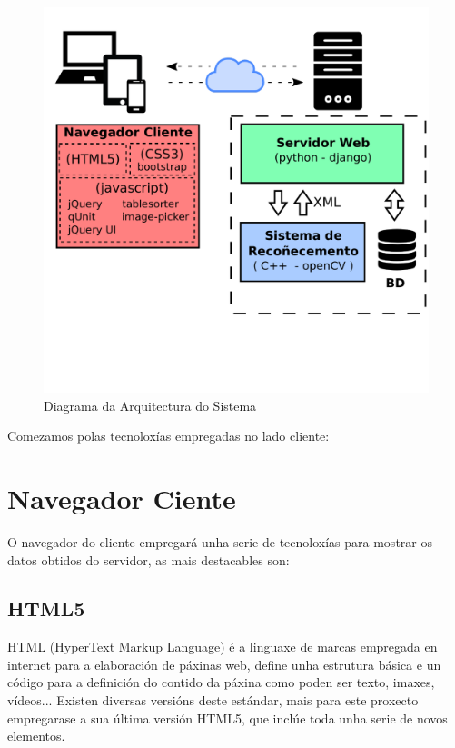     \begin{figure}[htp]
    \begin{center}
        \includegraphics[scale=0.6]{figures/ArqSistemaCustom.pdf}
        \caption{Diagrama da Arquitectura do Sistema}
    \label{fig:ArqSistemaCustom}
    \end{center}
    \end{figure}
    
    Comezamos polas tecnoloxías empregadas no lado cliente:
    \section{Navegador Ciente}
    
    O navegador do cliente empregará unha serie de tecnoloxías para mostrar os datos obtidos do 
    servidor, as mais destacables son:
    
    \subsection{HTML5}
        HTML (HyperText Markup Language) é a linguaxe de marcas empregada en internet para a elaboración
        de páxinas web, define unha estrutura básica e un código para a definición do contido da páxina
        como poden ser texto, imaxes, vídeos... Existen diversas versións deste estándar, mais para este
        proxecto empregarase a sua última versión HTML5, que inclúe toda unha serie de novos elementos.
        
